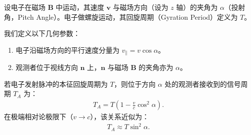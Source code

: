 设电子在磁场 $\mathbf{B}$ 中运动，其速度 $\mathbf{v}$ 与磁场方向（设为 $z$ 轴）的夹角为 $\alpha$（投射角，Pitch Angle）。电子做螺旋运动，其回旋周期（Gyration Period）定义为 $T$。

\begin{definition}[几何设定]
\label{def:geometry}
我们定义以下几何参数：
\begin{enumerate}
    \item 电子沿磁场方向的平行速度分量为 $v_{\parallel} = v \cos\alpha$。
    \item 观测者位于视线方向 $\mathbf{n}$ 上，$\mathbf{n}$ 与磁场 $\mathbf{B}$ 的夹角亦为 $\alpha$。
\end{enumerate}
\end{definition}

\begin{theorem}[观测周期修正公式]
\label{thm:doppler_period}
若电子发射脉冲的本征回旋周期为 $T$，则位于方向 $\alpha$ 处的观测者接收到的信号周期 $T_{A}$ 为：
\begin{align}
    T_{A} = T \left( 1 - \frac{v}{c} \cos^2\alpha \right).
    \label{eq:period_exact}
\end{align}
在极端相对论极限下（$v \to c$），该关系近似为：
\begin{align}
    T_{A} \approx T \sin^2\alpha.
    \label{eq:period_approx}
\end{align}
\end{theorem}

